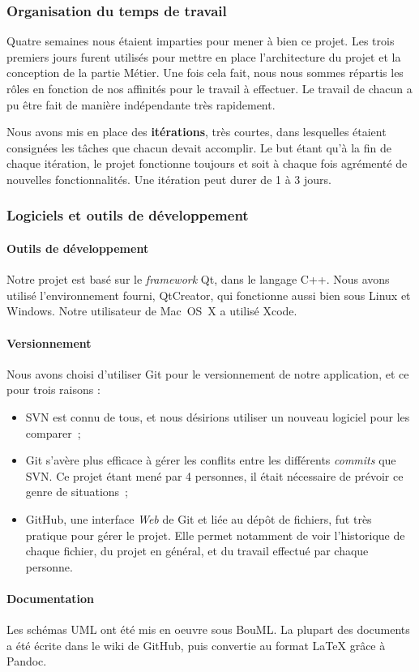 \subsubsection{Organisation du temps de travail}

Quatre semaines nous étaient imparties pour mener à bien ce projet.
Les trois premiers jours furent utilisés pour mettre en place
l'architecture du projet et la conception de la partie Métier. Une
fois cela fait, nous nous sommes répartis les rôles en fonction de
nos affinités pour le travail à effectuer. Le travail de chacun a
pu être fait de manière indépendante très rapidement.

Nous avons mis en place des \textbf{itérations}, très courtes, dans
lesquelles étaient consignées les tâches que chacun devait
accomplir. Le but étant qu'à la fin de chaque itération, le projet
fonctionne toujours et soit à chaque fois agrémenté de nouvelles
fonctionnalités. Une itération peut durer de 1 à 3 jours.

\subsubsection{Logiciels et outils de développement}

\paragraph{Outils de développement}

Notre projet est basé sur le \emph{framework} Qt, dans le langage
C++. Nous avons utilisé l'environnement fourni, QtCreator, qui
fonctionne aussi bien sous Linux et Windows. Notre utilisateur de
Mac~OS~X a utilisé Xcode.

\paragraph{Versionnement}

Nous avons choisi d'utiliser Git pour le versionnement de notre
application, et ce pour trois raisons :

\begin{itemize}
\item
  SVN est connu de tous, et nous désirions utiliser un nouveau
  logiciel pour les comparer~;
\item
  Git s'avère plus efficace à gérer les conflits entre les différents
  \emph{commits} que SVN. Ce projet étant mené par 4 personnes, il
  était nécessaire de prévoir ce genre de situations~;
\item
  GitHub, une interface \emph{Web} de Git et liée au dépôt de
  fichiers, fut très pratique pour gérer le projet. Elle permet
  notamment de voir l'historique de chaque fichier, du projet en
  général, et du travail effectué par chaque personne.
\end{itemize}

\paragraph{Documentation}

Les schémas UML ont été mis en oeuvre sous BouML. La plupart des
documents a été écrite dans le wiki de GitHub, puis convertie au
format LaTeX grâce à Pandoc.

